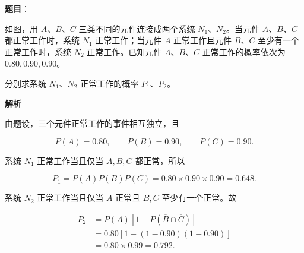 \begin{answer}

\textbf{题目}：

如图，用 $A$、$B$、$C$ 三类不同的元件连接成两个系统 $N_1$、$N_2$。当元件 $A$、$B$、$C$ 都正常工作时，系统 $N_1$ 正常工作；当元件 $A$ 正常工作且元件 $B$、$C$ 至少有一个正常工作时，系统 $N_2$ 正常工作。已知元件 $A$、$B$、$C$ 正常工作的概率依次为 $0.80,0.90,0.90$。
\nopagebreak[4]
\begin{center}\end{center}
\nopagebreak[4]
分别求系统 $N_1$、$N_2$ 正常工作的概率 $P_1$、$P_2$。

\textbf{解析}

由题设，三个元件正常工作的事件相互独立，且

\nopagebreak[4]
\[
P(A)=0.80,\qquad P(B)=0.90,\qquad P(C)=0.90.
\]

系统 $N_1$ 正常工作当且仅当 $A,B,C$ 都正常，所以

\nopagebreak[4]
\[
P_1=P(A)P(B)P(C)
=0.80\times0.90\times0.90=0.648.
\]

系统 $N_2$ 正常工作当且仅当 $A$ 正常且 $B,C$ 至少有一个正常。故

\nopagebreak[4]
\[
\begin{aligned}
P_2
&=P(A)\left[1-P(\overline B\cap\overline C)\right]\\
&=0.80\left[1-(1-0.90)(1-0.90)\right]\\
&=0.80\times0.99=0.792.
\end{aligned}
\]


\end{answer}
